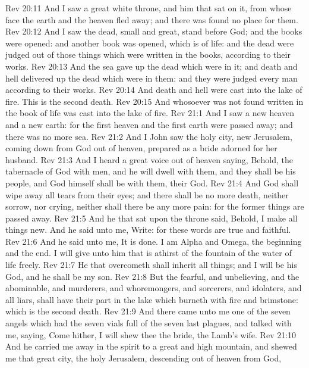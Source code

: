 \vs Rev 20:11 And I saw a great white throne, and him that sat on it, from whose face the earth and the heaven fled away; and there was found no place for them.
\vs Rev 20:12 And I saw the dead, small and great, stand before God; and the books were opened: and another book was opened, which is  of life: and the dead were judged out of those things which were written in the books, according to their works.
\vs Rev 20:13 And the sea gave up the dead which were in it; and death and hell delivered up the dead which were in them: and they were judged every man according to their works.
\vs Rev 20:14 And death and hell were cast into the lake of fire. This is the second death.
\vs Rev 20:15 And whosoever was not found written in the book of life was cast into the lake of fire.
\vs Rev 21:1 And I saw a new heaven and a new earth: for the first heaven and the first earth were passed away; and there was no more sea.
\vs Rev 21:2 And I John saw the holy city, new Jerusalem, coming down from God out of heaven, prepared as a bride adorned for her husband.
\vs Rev 21:3 And I heard a great voice out of heaven saying, Behold, the tabernacle of God  with men, and he will dwell with them, and they shall be his people, and God himself shall be with them,  their God.
\vs Rev 21:4 And God shall wipe away all tears from their eyes; and there shall be no more death, neither sorrow, nor crying, neither shall there be any more pain: for the former things are passed away.
\vs Rev 21:5 And he that sat upon the throne said, Behold, I make all things new. And he said unto me, Write: for these words are true and faithful.
\vs Rev 21:6 And he said unto me, It is done. I am Alpha and Omega, the beginning and the end. I will give unto him that is athirst of the fountain of the water of life freely.
\vs Rev 21:7 He that overcometh shall inherit all things; and I will be his God, and he shall be my son.
\vs Rev 21:8 But the fearful, and unbelieving, and the abominable, and murderers, and whoremongers, and sorcerers, and idolaters, and all liars, shall have their part in the lake which burneth with fire and brimstone: which is the second death.
\vs Rev 21:9 And there came unto me one of the seven angels which had the seven vials full of the seven last plagues, and talked with me, saying, Come hither, I will shew thee the bride, the Lamb's wife.
\vs Rev 21:10 And he carried me away in the spirit to a great and high mountain, and shewed me that great city, the holy Jerusalem, descending out of heaven from God,

